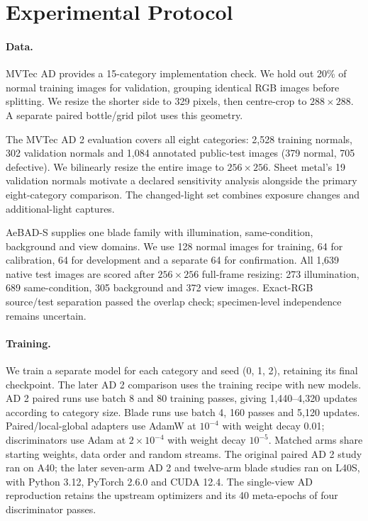 \documentclass[letterpaper]{article}
\begin{document}
\section{Experimental Protocol}

\paragraph{Data.}
MVTec AD \citep{bergmann2019mvtec} provides a 15-category implementation check. We hold out
20\% of normal training images for validation, grouping identical RGB images before
splitting. We resize the shorter side to 329 pixels, then centre-crop to $288\times288$.
A separate paired
bottle/grid pilot uses this geometry.

The MVTec AD 2 evaluation \citep{heckler2026ad2} covers all eight categories: 2,528 training
normals, 302 validation normals and 1,084 annotated public-test images (379 normal, 705
defective). We bilinearly resize the entire image to $256\times256$. Sheet metal's 19
validation normals motivate a declared sensitivity analysis alongside the primary
eight-category comparison. The changed-light set combines exposure changes and
additional-light captures.

AeBAD-S \citep{zhang2023aebad} supplies one blade family with illumination, same-condition,
background and view domains. We use 128 normal images for training, 64 for calibration, 64
for development and a separate 64 for confirmation. All 1,639 native test images are scored
after $256\times256$ full-frame resizing: 273 illumination, 689 same-condition, 305
background and 372 view images. Exact-RGB source/test separation passed the overlap check;
specimen-level independence remains uncertain.

\paragraph{Training.}
We train a separate model for each category and seed (0, 1, 2), retaining its final
checkpoint. The later AD 2 comparison uses the training recipe
with new models. AD 2 paired runs use batch 8 and 80 training passes, giving 1,440--4,320
updates according to category size.
Blade runs use batch 4, 160 passes and 5,120 updates. Paired/local-global adapters use AdamW
at $10^{-4}$ with weight decay 0.01; discriminators use Adam at $2\times10^{-4}$ with weight
decay $10^{-5}$. Matched arms share starting weights, data order and random streams. The
original paired AD 2 study ran on A40; the later seven-arm AD 2 and twelve-arm blade studies
ran on L40S, with Python 3.12, PyTorch 2.6.0 and CUDA 12.4. The single-view AD reproduction
retains the upstream optimizers and its 40 meta-epochs of four discriminator passes.
\end{document}
